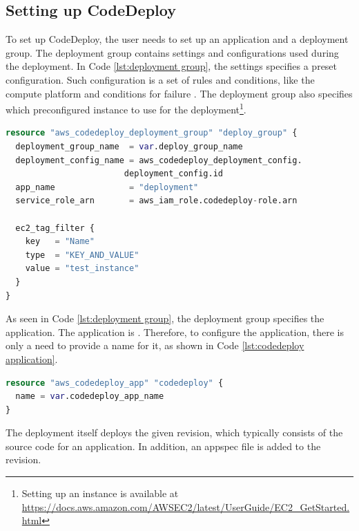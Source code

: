 \subsection{Setting up CodeDeploy}
To set up CodeDeploy, the user needs to set up an application and a deployment group. The deployment group contains settings and configurations used during the deployment. In Code \ref{lst:deployment group}, the settings specifies a preset configuration. Such configuration is a set of rules and conditions, like the compute platform and conditions for failure \cite{CodeDeployConfig}. The deployment group also specifies which preconfigured instance to use for the deployment\footnote{Setting up an instance is available at \url{https://docs.aws.amazon.com/AWSEC2/latest/UserGuide/EC2_GetStarted.html}}. 
\\
\begin{lstlisting}[language=terraform, caption=Create the deployment group, captionpos=b, frame=single, label= {lst:deployment group}]
resource "aws_codedeploy_deployment_group" "deploy_group" {
  deployment_group_name  = var.deploy_group_name
  deployment_config_name = aws_codedeploy_deployment_config.
                        deployment_config.id
  app_name               = "deployment"
  service_role_arn       = aws_iam_role.codedeploy-role.arn

  ec2_tag_filter {
    key   = "Name"
    type  = "KEY_AND_VALUE"
    value = "test_instance"
  }
}
\end{lstlisting}

As seen in Code \ref{lst:deployment group}, the deployment group specifies the application. The application is  \cite{CodeDeployApplication}. Therefore, to configure the application, there is only a need to provide a name for it, as shown in Code \ref{lst:codedeploy application}.
\\
\begin{lstlisting}[language=terraform, caption=Create an application for the deployment, captionpos=b, frame=single, label= lst:codedeploy application]
resource "aws_codedeploy_app" "codedeploy" {
  name = var.codedeploy_app_name
}
\end{lstlisting}

The deployment itself deploys the given revision, which typically consists of the source code for an application. In addition, an \gls{appspec} file is added to the revision. 

